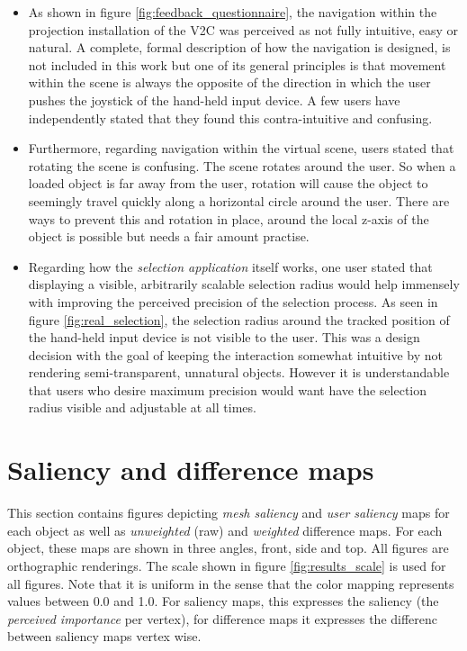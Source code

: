 \begin{itemize}
	\item As shown in figure \ref{fig:feedback_questionnaire}, the navigation within the projection installation of the V2C was perceived as not fully intuitive, easy or natural. A complete, formal description of how the navigation is designed, is not included in this work but one of its general principles is that movement within the scene is always the opposite of the direction in which the user pushes the joystick of the hand-held input device. A few users have independently stated that they found this contra-intuitive and confusing.
	\item Furthermore, regarding navigation within the virtual scene, users stated that rotating the scene is confusing. The scene rotates around the user. So when a loaded object is far away from the user, rotation will cause the object to seemingly travel quickly along a horizontal circle around the user. There are ways to prevent this and rotation in place, around the local z-axis of the object is possible but needs a fair amount practise.
	\item Regarding how the \textit{selection application} itself works, one user stated that displaying a visible, arbitrarily scalable selection radius would help immensely with improving the perceived precision of the selection process. As seen in figure \ref{fig:real_selection}, the selection radius around the tracked position of the hand-held input device is not visible to the user. This was a design decision with the goal of keeping the interaction somewhat intuitive by not rendering semi-transparent, unnatural objects. However it is understandable that users who desire maximum precision would want have the selection radius visible and adjustable at all times.
\end{itemize}

	\section{Saliency and difference maps}
	\label{sec:saliency_and_difference_maps}
This section contains figures depicting \textit{mesh saliency} and \textit{user saliency} maps for each object as well as \textit{unweighted} (raw) and \textit{weighted} difference maps. For each object, these maps are shown in three angles, front, side and top. All figures are orthographic renderings. The scale shown in figure \ref{fig:results_scale} is used for all figures. Note that it is uniform in the sense that the color mapping represents values between 0.0 and 1.0. For saliency maps, this expresses the saliency (the \textit{perceived importance} per vertex), for difference maps it expresses the differenc between saliency maps vertex wise.

